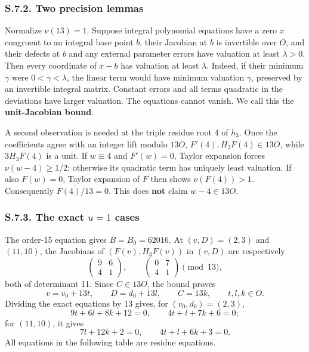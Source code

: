 \documentclass[
  british,
  10pt,
]{article}
\begin{document}
\subsubsection{S.7.2. Two precision
lemmas}\label{s.7.2.-two-precision-lemmas}

Normalize \(\nu(13)=1\). Suppose integral polynomial equations have a
zero \(x\) congruent to an integral base point \(b\), their Jacobian at
\(b\) is invertible over \(O\), and their defects at \(b\) and any
external parameter errors have valuation at least \(\lambda>0\). Then
every coordinate of \(x-b\) has valuation at least \(\lambda\). Indeed,
if their minimum \(\gamma\) were \(0<\gamma<\lambda\), the linear term
would have minimum valuation \(\gamma\), preserved by an invertible
integral matrix. Constant errors and all terms quadratic in the
deviations have larger valuation. The equations cannot vanish. We call
this the \textbf{unit-Jacobian bound}.

A second observation is needed at the triple residue root 4 of \(h_3\).
Once the coefficients agree with an integer lift modulo \(13O\),
\(F'(4),H_2F(4)\in13O\), while \(3H_3F(4)\) is a unit. If \(w\equiv4\)
and \(F'(w)=0\), Taylor expansion forces \(\nu(w-4)\ge1/2\); otherwise
its quadratic term has uniquely least valuation. If also \(F(w)=0\),
Taylor expansion of \(F\) then shows \(\nu(F(4))>1\). Consequently
\(\overline{F(4)/13}=0\). This does \textbf{not} claim \(w-4\in13O\).

\subsubsection{\texorpdfstring{S.7.3. The exact \(u=1\)
cases}{S.7.3. The exact u=1 cases}}\label{s.7.3.-the-exact-u1-cases}

The order-15 equation gives \(B=B_0=62016\). At \((v,D)=(2,3)\) and
\((11,10)\), the Jacobians of \((F(v),H_3F(v))\) in \((v,D)\) are
respectively \[
\begin{pmatrix}9&6\\4&1\end{pmatrix},\qquad
\begin{pmatrix}0&7\\4&1\end{pmatrix}
\pmod{13},
\] both of determinant 11. Since \(C\in13O\), the bound proves \[
v=v_0+13t,\qquad D=d_0+13l,\qquad C=13k,\qquad t,l,k\in O.
\] Dividing the exact equations by 13 gives, for \((v_0,d_0)=(2,3)\), \[
9t+6l+8k+12=0,\qquad 4t+l+7k+6=0;
\tag{S18}
\] for \((11,10)\), it gives \[
7l+12k+2=0,\qquad 4t+l+6k+3=0.
\tag{S19}
\] All equations in the following table are residue equations.
\end{document}

